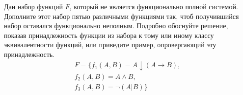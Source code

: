 \question
Дан набор функций $F$, который не является функционально полной системой. Дополните этот набор пятью различными функциями так, чтоб получившийся набор оставался функционально неполным. Подробно обоснуйте решение, показав  принадлежность функции из набора к тому или иному классу эквивалентности функций, или приведите пример, опровергающий эту принадлежность. 
\begin{gather*}
F = \{f_1(A,B) = A \downarrow (A \to B), \\
f_2(A,B) =  A \land B, \\
f_3(A,B) =  \neg(A | B)\}
\end{gather*}
